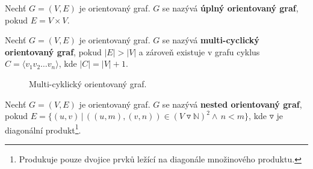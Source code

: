             \begin{definition}
                Nechť $G = (V, E)$ je orientovaný graf. $G$ se nazývá \textbf{úplný orientovaný graf}, pokud $E = V \times V$.
            \end{definition}

            \begin{definition}
                Nechť $G = (V, E)$ je orientovaný graf. $G$ se nazývá \textbf{multi-cyclický orientovaný graf}, pokud $|E| > |V|$ a zároveň existuje v grafu cyklus $C = \langle v_1v_2 \dots v_n \rangle$, kde $|C| = |V| + 1$.
            \end{definition}

            \newpage

            \begin{figure}
                \centering
                \caption{Multi-cyklický orientovaný graf.}
            \end{figure}

            \begin{definition}
                Nechť $G = (V, E)$ je orientovaný graf. $G$ se nazývá \textbf{nested orientovaný graf}, pokud $E = \{(u, v) \,|\, ((u, m), (v, n)) \in (V \triangledown \mathbb{N})^2 \land\, n < m\}$, kde $\triangledown$ je diagonální produkt\footnote{Produkuje pouze dvojice prvků ležící na diagonále množinového produktu.}.
            \end{definition}

